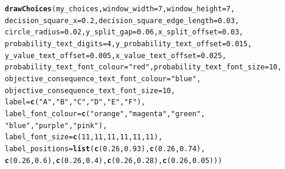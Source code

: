 \documentclass{article}\usepackage[]{graphicx}\usepackage[]{color}
\makeatletter
\newcommand{\hlnum}[1]{\textcolor[rgb]{0.686,0.059,0.569}{#1}}%
\newcommand{\hlstr}[1]{\textcolor[rgb]{0.192,0.494,0.8}{#1}}%
\newcommand{\hlstd}[1]{\textcolor[rgb]{0.345,0.345,0.345}{#1}}%
\newcommand{\hlkwc}[1]{\textcolor[rgb]{0.333,0.667,0.333}{#1}}%
\newcommand{\hlkwd}[1]{\textcolor[rgb]{0.737,0.353,0.396}{\textbf{#1}}}%
\newenvironment{kframe}{%
 \def\at@end@of@kframe{}%
 \ifinner\ifhmode%
  \def\at@end@of@kframe{\end{minipage}}%
  \begin{minipage}{\columnwidth}%
 \fi\fi%
 \def\FrameCommand##1{\hskip\@totalleftmargin \hskip-\fboxsep
 \colorbox{shadecolor}{##1}\hskip-\fboxsep
     \hskip-\linewidth \hskip-\@totalleftmargin \hskip\columnwidth}%
 \MakeFramed {\advance\hsize-\width
   \@totalleftmargin\z@ \linewidth\hsize
   \@setminipage}}%
 {\par\unskip\endMakeFramed%
 \at@end@of@kframe}
\newenvironment{knitrout}{}{} %
\makeatother
\begin{document}
\begin{knitrout}
\begin{kframe}
\begin{verbatim}
\end{verbatim}
\begin{alltt}
\hlkwd{drawChoices}\hlstd{(my_choices,} \hlkwc{window_width}\hlstd{=}\hlnum{7}\hlstd{,} \hlkwc{window_height}\hlstd{=}\hlnum{7}\hlstd{,}
        \hlkwc{decision_square_x}\hlstd{=}\hlnum{0.2}\hlstd{,} \hlkwc{decision_square_edge_length}\hlstd{=}\hlnum{0.03}\hlstd{,}
        \hlkwc{circle_radius}\hlstd{=}\hlnum{0.02}\hlstd{,} \hlkwc{y_split_gap}\hlstd{=}\hlnum{0.06}\hlstd{,} \hlkwc{x_split_offset}\hlstd{=}\hlnum{0.03}\hlstd{,}
        \hlkwc{probability_text_digits}\hlstd{=}\hlnum{4}\hlstd{,} \hlkwc{y_probability_text_offset}\hlstd{=}\hlnum{0.015}\hlstd{,}
        \hlkwc{y_value_text_offset}\hlstd{=}\hlnum{0.005}\hlstd{,} \hlkwc{x_value_text_offset}\hlstd{=}\hlnum{0.025}\hlstd{,}
        \hlkwc{probability_text_font_colour}\hlstd{=}\hlstr{"red"}\hlstd{,} \hlkwc{probability_text_font_size}\hlstd{=}\hlnum{10}\hlstd{,}
        \hlkwc{objective_consequence_text_font_colour}\hlstd{=}\hlstr{"blue"}\hlstd{,}
        \hlkwc{objective_consequence_text_font_size}\hlstd{=}\hlnum{10}\hlstd{,}
        \hlkwc{label}\hlstd{=}\hlkwd{c}\hlstd{(}\hlstr{"A"}\hlstd{,}\hlstr{"B"}\hlstd{,}\hlstr{"C"}\hlstd{,} \hlstr{"D"}\hlstd{,}\hlstr{"E"}\hlstd{,}\hlstr{"F"}\hlstd{),}
        \hlkwc{label_font_colour}\hlstd{=}\hlkwd{c}\hlstd{(}\hlstr{"orange"}\hlstd{,}\hlstr{"magenta"}\hlstd{,}\hlstr{"green"}\hlstd{,}
                \hlstr{"blue"}\hlstd{,}\hlstr{"purple"}\hlstd{,}\hlstr{"pink"}\hlstd{),}
        \hlkwc{label_font_size}\hlstd{=}\hlkwd{c}\hlstd{(}\hlnum{11}\hlstd{,}\hlnum{11}\hlstd{,}\hlnum{11}\hlstd{,}\hlnum{11}\hlstd{,}\hlnum{11}\hlstd{,}\hlnum{11}\hlstd{),}
        \hlkwc{label_positions}\hlstd{=}\hlkwd{list}\hlstd{(}\hlkwd{c}\hlstd{(}\hlnum{0.26}\hlstd{,}\hlnum{0.93}\hlstd{),}\hlkwd{c}\hlstd{(}\hlnum{0.26}\hlstd{,}\hlnum{0.74}\hlstd{),}
                \hlkwd{c}\hlstd{(}\hlnum{0.26}\hlstd{,}\hlnum{0.6}\hlstd{),}\hlkwd{c}\hlstd{(}\hlnum{0.26}\hlstd{,}\hlnum{0.4}\hlstd{),}\hlkwd{c}\hlstd{(}\hlnum{0.26}\hlstd{,}\hlnum{0.28}\hlstd{),}\hlkwd{c}\hlstd{(}\hlnum{0.26}\hlstd{,}\hlnum{0.05}\hlstd{)))}
\end{alltt}
\end{kframe}


\end{knitrout}
\end{document}
